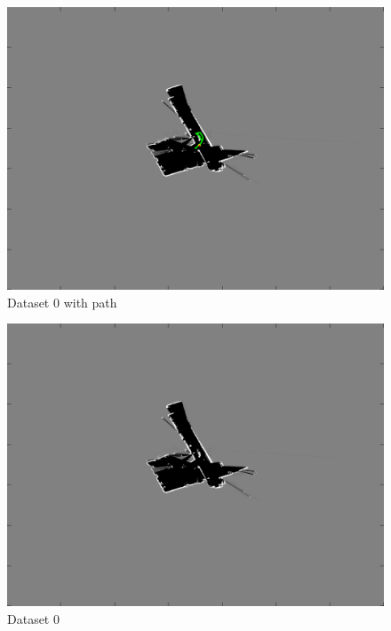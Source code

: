 \documentclass[english]{article}
\begin{document}
\begin{figure}[h]
\centering
\includegraphics[scale=0.65]{slam0_result}
\caption{Dataset 0 with path}
\end{figure}

\begin{figure}[h]
\centering
\includegraphics[scale=0.65]{slam0_result1}
\caption{Dataset 0}
\end{figure}
\end{document}
